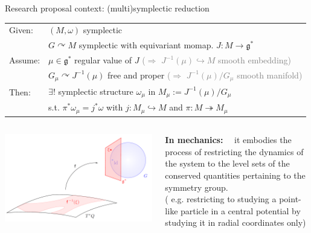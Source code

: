\documentclass[handout,10pt]{beamer}
\renewcommand{\action}{\curvearrowright}
\begin{document}
\begin{frame}{Research proposal context: (multi)symplectic reduction}

	\pause
	\begin{thmblock}
		\vspace{-.4em}
		\begin{tabular}{l p{12cm}}
		    Given: & $(M,\omega)$ symplectic
		    \\
		    & $G\curvearrowright M$ symplectic with equivariant momap. $J:M\to \mathfrak{g}^*$
		    \\[.2em]
		    Assume: & $\mu \in \mathfrak{g}^*$ regular value of $J$ 
		    \qquad\quad \footnotesize \textcolor{gray}{($\Rightarrow$ $J^{-1}(\mu)\hookrightarrow M$ smooth embedding)}
		    \\
			& $G_\mu\action J^{-1}(\mu)$ free and proper
			\quad \footnotesize \textcolor{gray}{($\Rightarrow$ $J^{-1}(\mu)/G_\mu$ smooth manifold)}
			\\[.4em]
			Then: & $\exists!$ symplectic structure $\omega_\mu$ in $M_\mu:= J^{-1}(\mu)/G_\mu$ \\
			& s.t. $\pi^\ast \omega_\mu = j^\ast \omega$ with $j:M_\mu \hookrightarrow M$ and $\pi:M\twoheadrightarrow M_\mu$
		\end{tabular}
		\vspace{-.4em}
	\end{thmblock}
	\vfill
	\pause
	\begin{columns}
		\begin{column}{0.40\textwidth}
			\includegraphics[width=\textwidth]{./Pictures/Reduction}
		\end{column}	
		
		\begin{column}{0.6\textwidth}
				\textbf{\color{UniGreen}In mechanics:}~~
			it embodies the process of restricting the dynamics of the system to the level sets of the conserved quantities pertaining to the symmetry group.		
			\\
			\color{gray}\small( e.g. restricting to studying a point-like particle in a central potential by studying it in radial coordinates only)
		\end{column}	
	\end{columns}	


\end{frame}
\end{document}
